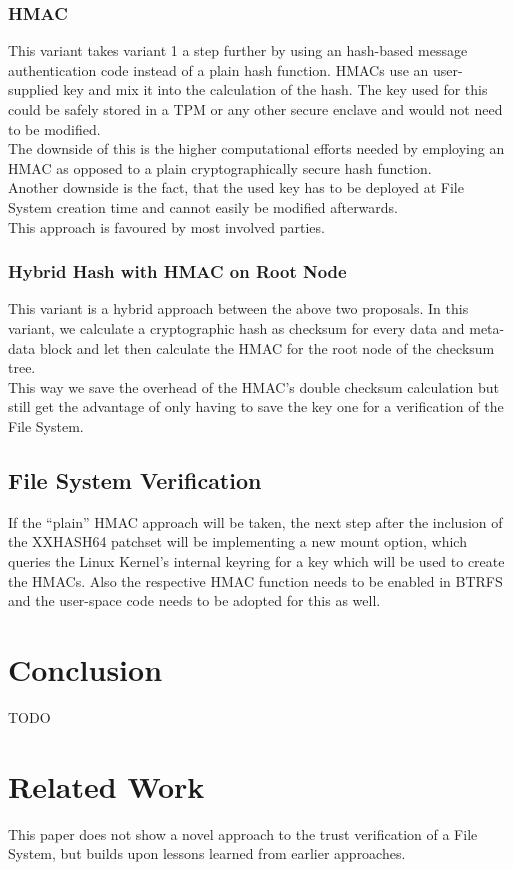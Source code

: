 \documentclass[10pt]{article}
\begin{document}
\subsubsection{HMAC}
This variant takes variant 1 a step further by using an hash-based message
authentication code \cite{HMAC} instead of a plain hash function. HMACs use an
user-supplied key and mix it into the calculation of the hash. The key used
for this could be safely stored in a TPM or any other secure enclave and would
not need to be modified.\\
The downside of this is the higher computational efforts needed by employing
an HMAC as opposed to a plain cryptographically secure hash function.\\
Another downside is the fact, that the used key has to be deployed at
File System creation time and cannot easily be modified afterwards.\\
This approach is favoured by most involved parties.

\subsubsection{Hybrid Hash with HMAC on Root Node}
This variant is a hybrid approach between the above two proposals. In this
variant, we calculate a cryptographic hash as checksum for every data and
meta-data block and let then calculate the HMAC for the root node of the
checksum tree.\\ This way we save the overhead of the HMAC's double checksum
calculation but still get the advantage of only having to save the key one for
a verification of the File System.

\subsection{File System Verification}
If the ``plain'' HMAC approach will be taken, the next step after the inclusion
of the XXHASH64 patchset will be implementing a new mount option, which
queries the Linux Kernel's internal keyring for a key which will be used to
create the HMACs. Also the respective HMAC function needs to be enabled in
BTRFS and the user-space code needs to be adopted for this as well.

\section{Conclusion}
TODO

\section{Related Work}
This paper does not show a novel approach to the trust verification of a 
File System, but builds upon lessons learned from earlier approaches.
\end{document}

